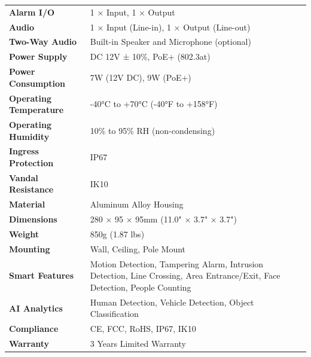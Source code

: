 \documentclass[11pt,a4paper]{article}
\begin{document}
{\begin{longtable}{@{}p{4cm}X@{}}
\textbf{Alarm I/O} & 1 × Input, 1 × Output \\
\textbf{Audio} & 1 × Input (Line-in), 1 × Output (Line-out) \\
\textbf{Two-Way Audio} & Built-in Speaker and Microphone (optional) \\
\textbf{Power Supply} & DC 12V ± 10\%, PoE+ (802.3at) \\
\textbf{Power Consumption} & 7W (12V DC), 9W (PoE+) \\
\textbf{Operating Temperature} & -40°C to +70°C (-40°F to +158°F) \\
\textbf{Operating Humidity} & 10\% to 95\% RH (non-condensing) \\
\textbf{Ingress Protection} & IP67 \\
\textbf{Vandal Resistance} & IK10 \\
\textbf{Material} & Aluminum Alloy Housing \\
\textbf{Dimensions} & 280 × 95 × 95mm (11.0" × 3.7" × 3.7") \\
\textbf{Weight} & 850g (1.87 lbs) \\
\textbf{Mounting} & Wall, Ceiling, Pole Mount \\
\textbf{Smart Features} & Motion Detection, Tampering Alarm, Intrusion Detection, Line Crossing, Area Entrance/Exit, Face Detection, People Counting \\
\textbf{AI Analytics} & Human Detection, Vehicle Detection, Object Classification \\
\textbf{Compliance} & CE, FCC, RoHS, IP67, IK10 \\
\textbf{Warranty} & 3 Years Limited Warranty \\

\end{longtable}
}
\end{document}
